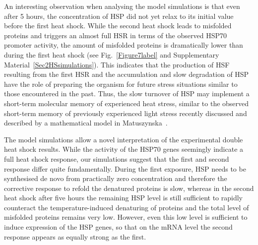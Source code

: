 \documentclass[oneside, 10pt, a4paper, twocolumn]{article}
\begin{document}
An interesting observation when analysing the model simulations is
that even after 5 hours, the concentration of HSP did not yet relax
to its initial value before the first heat shock. 
While the second heat shock leads to misfolded
proteins and triggers an almost full HSR in terms of 
the observed HSP70 promoter activity, the amount of misfolded proteins
is dramatically lower than during the first heat shock (see Fig.~\ref{Figure7label} 
and Supplementary Material~\ref{Sec2HSsimulations}). 
This indicates that the 
production of HSF resulting from the first HSR and the accumulation
and slow degradation of HSP have the role of preparing the organism for future
stress situations similar to those encountered in the past. Thus, the slow turnover of HSP may
implement a short-term molecular memory of experienced heat stress,
similar to the observed short-term memory of previously experienced light
stress recently discussed and described by a mathematical model 
in Matuszynska~\cite{Matuszynska2016}.

The model simulations allow a novel interpretation of
the experimental  double heat shock results. While the
activity of the HSP70 genes seemingly indicate a full heat shock response, our simulations suggest that the first and second response differ quite fundamentally.
During the first exposure, HSP needs to be synthesised de novo
from practically zero concentration and therefore the corrective
response to refold the denatured proteins is slow, whereas in the second heat
shock after five hours the remaining HSP level is still sufficient to rapidly
counteract the temperature-induced denaturing of proteins and the total
level of misfolded proteins remains very low. However, even this low level is
sufficient to induce expression of the HSP genes, so that on the mRNA level
the second response appears as equally strong as the first.


\end{document}
